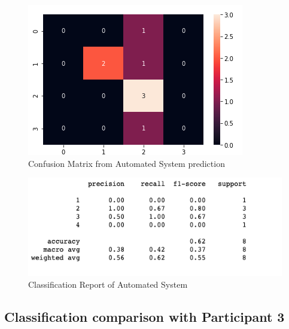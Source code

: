 \pagebreak

\begin{figure}[!htp]
    \includegraphics[width=\textwidth]{Images/a2.png}
    \caption{Confusion Matrix from Automated System prediction}
    \label{fig:f11}
\end{figure}

\begin{figure}[!htp]
    \includegraphics[width=\textwidth]{Images/a2r.png}
    \caption{Classification Report of Automated System}
    \label{fig:f11}
\end{figure}


\pagebreak
\subsection*{Classification comparison with Participant 3 }

